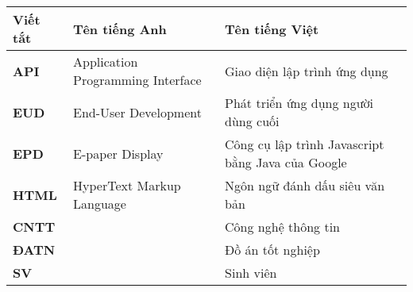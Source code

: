 \documentclass[../DoAn.tex]{subfiles}
\begin{document}
\begin{longtable}{l p{6cm} p{7cm}}
	\hline
   \textbf{Viết tắt}  & \textbf{Tên tiếng Anh}	& \textbf{Tên tiếng Việt} \\ \hline 
	\textbf{API} & Application Programming Interface & Giao diện lập trình ứng dụng\\
	\textbf{EUD} & End-User Development & Phát triển ứng dụng người dùng cuối\\
	\textbf{EPD} & E-paper Display & Công cụ lập trình Javascript bằng Java của Google\\
	\textbf{HTML} & HyperText Markup Language & Ngôn ngữ đánh dấu siêu văn bản\\
	\textbf{CNTT }  &   & Công nghệ thông tin\\
	\textbf{ĐATN} &  & Đồ án tốt nghiệp \\
	\textbf{SV} &  & Sinh viên \\

    \hline
\end{longtable}
\end{document}

